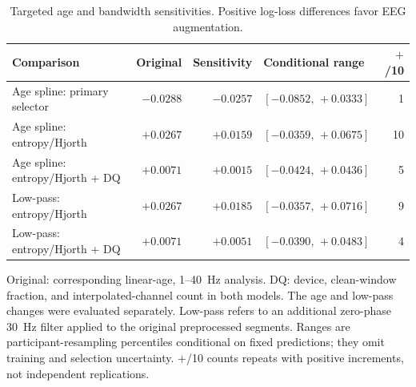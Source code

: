 \begin{table}[htbp]
\centering
\caption{Targeted age and bandwidth sensitivities. Positive log-loss differences favor EEG augmentation.}
\label{tab:targeted}
\begin{tabular}{@{}p{4.8cm}rrlr@{}}
\toprule
Comparison & Original & Sensitivity & Conditional range & $+$/10 \\
\midrule
Age spline: primary selector & $-0.0288$ & $-0.0257$ & $[-0.0852,\,+0.0333]$ & 1 \\
Age spline: entropy/Hjorth & $+0.0267$ & $+0.0159$ & $[-0.0359,\,+0.0675]$ & 10 \\
Age spline: entropy/Hjorth + DQ & $+0.0071$ & $+0.0015$ & $[-0.0424,\,+0.0436]$ & 5 \\
Low-pass: entropy/Hjorth & $+0.0267$ & $+0.0185$ & $[-0.0357,\,+0.0716]$ & 9 \\
Low-pass: entropy/Hjorth + DQ & $+0.0071$ & $+0.0051$ & $[-0.0390,\,+0.0483]$ & 4 \\
\bottomrule
\end{tabular}
\par\smallskip\begin{minipage}{\textwidth}
Original: corresponding linear-age, 1--40~Hz analysis. DQ: device, clean-window fraction, and interpolated-channel count in both models. The age and low-pass changes were evaluated separately. Low-pass refers to an additional zero-phase 30~Hz filter applied to the original preprocessed segments. Ranges are participant-resampling percentiles conditional on fixed predictions; they omit training and selection uncertainty. $+$/10 counts repeats with positive increments, not independent replications.
\end{minipage}
\end{table}

